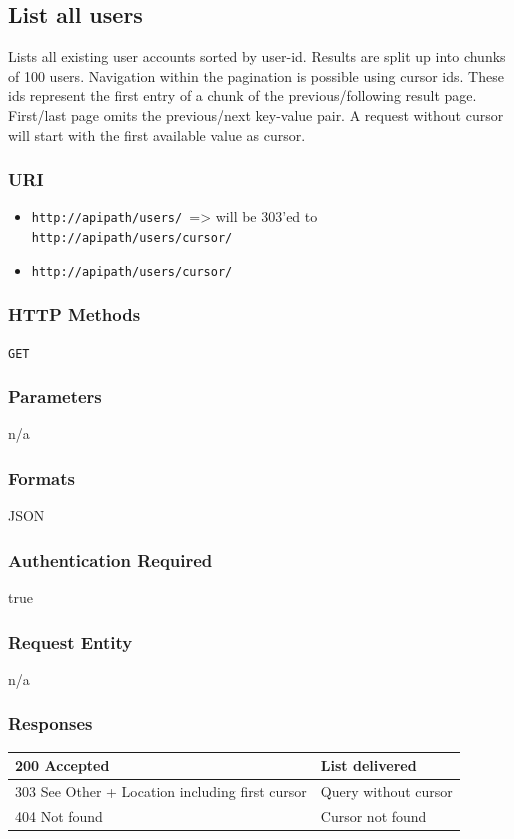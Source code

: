 \documentclass[10pt]{article}
\begin{document}
\subsection{List all users}
Lists all existing user accounts sorted by user-id. Results are split up into chunks of 100 users. Navigation within the pagination is possible using cursor ids. These ids represent the first entry of a chunk of the previous/following result page. First/last page omits the previous/next key-value pair. A request without cursor will start with the first available value as cursor.
\subsubsection{URI}
\begin{itemize}
\item \texttt{http://apipath/users/ }=> will be 303'ed  to \texttt{http://apipath/users/cursor/
}\item \texttt{http://apipath/users/cursor/
}\end{itemize}
\subsubsection{HTTP Methods}
\texttt{GET}
\subsubsection{Parameters}
n/a
\subsubsection{Formats}
JSON
\subsubsection{Authentication Required}
true
\subsubsection{Request Entity}
n/a
\subsubsection{Responses}
\begin{tabular}{|l|l|}\hline
200 Accepted & List delivered \\
\hline
303 See Other + Location including first cursor & Query without cursor \\
\hline
404 Not found & Cursor not found \\
\hline
\end{tabular}
\end{document}
